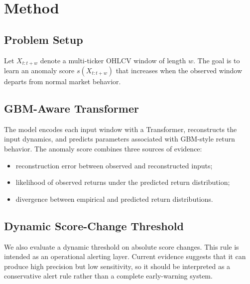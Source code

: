 \section{Method}

\subsection{Problem Setup}

Let $X_{t:t+w}$ denote a multi-ticker OHLCV window of length $w$. The goal is to learn an anomaly score $s(X_{t:t+w})$ that increases when the observed window departs from normal market behavior.

\subsection{GBM-Aware Transformer}

The model encodes each input window with a Transformer, reconstructs the input dynamics, and predicts parameters associated with GBM-style return behavior. The anomaly score combines three sources of evidence:

\begin{itemize}
  \item reconstruction error between observed and reconstructed inputs;
  \item likelihood of observed returns under the predicted return distribution;
  \item divergence between empirical and predicted return distributions.
\end{itemize}

\subsection{Dynamic Score-Change Threshold}

We also evaluate a dynamic threshold on absolute score changes. This rule is intended as an operational alerting layer. Current evidence suggests that it can produce high precision but low sensitivity, so it should be interpreted as a conservative alert rule rather than a complete early-warning system.

